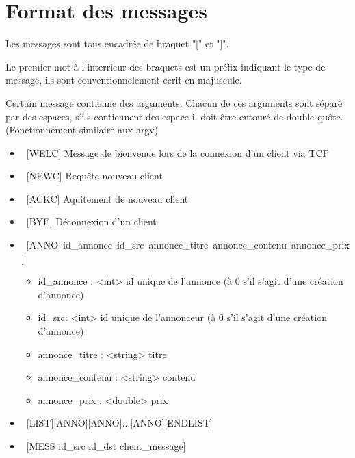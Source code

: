 \documentclass[12pt]{article}
\begin{document}
\section{Format des messages}

Les messages sont tous encadrée de braquet "[" et "]".

Le premier mot à l'interrieur des braquets est un préfix indiquant le type de message, ils sont conventionnelement ecrit en majuscule.

Certain message contienne des arguments. Chacun de ces arguments sont séparé par des espaces, s'ils contiennent des espace il doit être
entouré de double quôte. (Fonctionnement similaire aux argv)

\begin{itemize}
  \item~[WELC] Message de bienvenue lors de la connexion d'un client via TCP
  \item~[NEWC] Requête nouveau client
  \item~[ACKC] Aquitement de nouveau client
  \item~[BYE]  Déconnexion d'un client
  \item~[ANNO~id\_annonce~id\_src~annonce\_titre~annonce\_contenu~annonce\_prix]
  \begin{itemize}
    \item id\_annonce : <int>  id unique de l'annonce (à 0 s'il s'agit d'une création d'annonce)
    \item id\_src: <int> id unique de l'annonceur (à 0 s'il s'agit d'une création d'annonce)
    \item annonce\_titre : <string> titre
    \item annonce\_contenu : <string> contenu
    \item annonce\_prix : <double> prix
  \end{itemize}
  \item~[LIST][ANNO][ANNO]...[ANNO][ENDLIST]
  \item~[MESS id\_src id\_dst client\_message]
\end{itemize}
\end{document}
